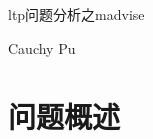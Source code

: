 \documentclass[scheme=plain]{ctexart}
\begin{document}

{}
\begin{center}
  \begin{Huge}
    ltp问题分析之madvise
  \end{Huge}
\end{center}

\begin{center}
  Cauchy Pu
\end{center}

\section{问题概述}
\label{sec:wtgs}
\end{document}
